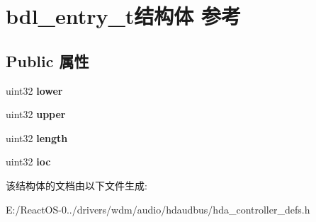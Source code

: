 \hypertarget{structbdl__entry__t}{}\section{bdl\+\_\+entry\+\_\+t结构体 参考}
\label{structbdl__entry__t}
\subsection*{Public 属性}
\begin{DoxyCompactItemize}
\item 
\mbox{\label{structbdl__entry__t_add5611d04dbd409e35f20256fb4037ae}} 
uint32 {\bfseries lower}
\item 
\mbox{\label{structbdl__entry__t_a1bba258d4924186a8c90076650746ea8}} 
uint32 {\bfseries upper}
\item 
\mbox{\label{structbdl__entry__t_ae90836728b1b18633eac984a4d4dfed6}} 
uint32 {\bfseries length}
\item 
\mbox{\label{structbdl__entry__t_aef75bf7ccbecb2e1f3f7b600495cb26c}} 
uint32 {\bfseries ioc}
\end{DoxyCompactItemize}


该结构体的文档由以下文件生成\+:\begin{DoxyCompactItemize}
\item 
E\+:/\+React\+O\+S-\/0../drivers/wdm/audio/hdaudbus/hda\+\_\+controller\+\_\+defs.\+h\end{DoxyCompactItemize}
